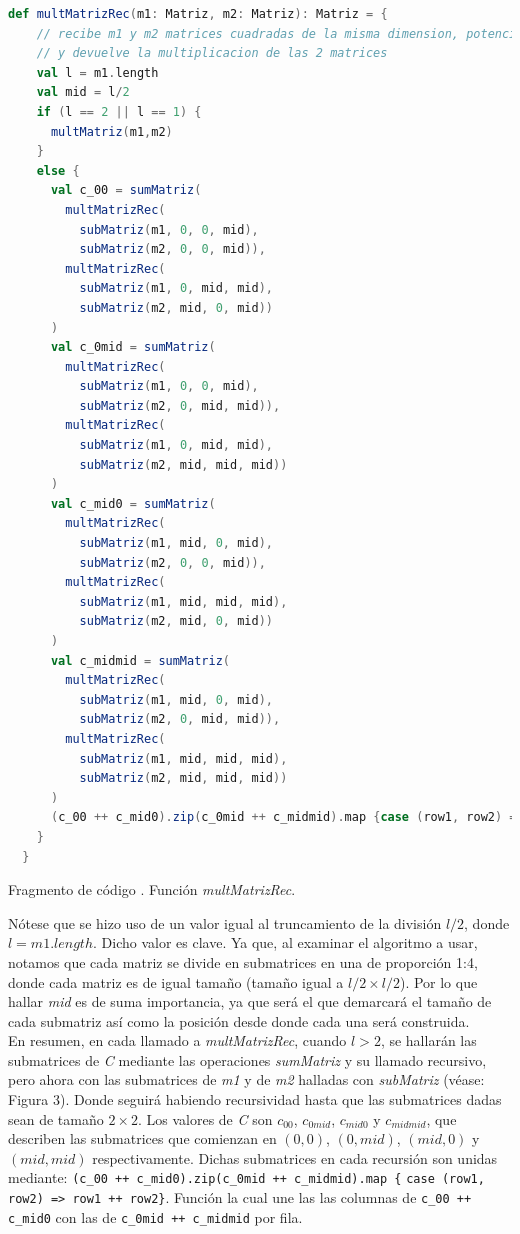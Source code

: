 \documentclass{article}
\newcounter{codesnippet}
\newcommand{\newcodesnippet}{%
  \stepcounter{codesnippet}%
}
\begin{document}
\newcodesnippet
\begin{lstlisting}[language=Scala]
  def multMatrizRec(m1: Matriz, m2: Matriz): Matriz = {
    // recibe m1 y m2 matrices cuadradas de la misma dimension, potencia de 2
    // y devuelve la multiplicacion de las 2 matrices
    val l = m1.length
    val mid = l/2
    if (l == 2 || l == 1) {
      multMatriz(m1,m2)
    }
    else {
      val c_00 = sumMatriz(
        multMatrizRec(
          subMatriz(m1, 0, 0, mid),
          subMatriz(m2, 0, 0, mid)),
        multMatrizRec(
          subMatriz(m1, 0, mid, mid),
          subMatriz(m2, mid, 0, mid))
      )
      val c_0mid = sumMatriz(
        multMatrizRec(
          subMatriz(m1, 0, 0, mid),
          subMatriz(m2, 0, mid, mid)),
        multMatrizRec(
          subMatriz(m1, 0, mid, mid),
          subMatriz(m2, mid, mid, mid))
      )
      val c_mid0 = sumMatriz(
        multMatrizRec(
          subMatriz(m1, mid, 0, mid),
          subMatriz(m2, 0, 0, mid)),
        multMatrizRec(
          subMatriz(m1, mid, mid, mid),
          subMatriz(m2, mid, 0, mid))
      )
      val c_midmid = sumMatriz(
        multMatrizRec(
          subMatriz(m1, mid, 0, mid),
          subMatriz(m2, 0, mid, mid)),
        multMatrizRec(
          subMatriz(m1, mid, mid, mid),
          subMatriz(m2, mid, mid, mid))
      )
      (c_00 ++ c_mid0).zip(c_0mid ++ c_midmid).map {case (row1, row2) => row1 ++ row2}
    }
  }
\end{lstlisting}
\begin{center}
    \small{Fragmento de código \thecodesnippet. Función \textit{multMatrizRec}.}
\end{center}

Nótese que se hizo uso de un valor igual al truncamiento de la división \(l/2\), donde \(l = m1.length\). Dicho valor es clave. Ya que, al examinar el algoritmo a usar, notamos que cada matriz se divide en submatrices en una de proporción 1:4, donde cada matriz es de igual tamaño (tamaño igual a \(l/2 \times l/2 \)). Por lo que hallar \textit{mid} es de suma importancia, ya que será el que demarcará el tamaño de cada submatriz así como la posición desde donde cada una será construida. \\

En resumen, en cada llamado a \textit{multMatrizRec}, cuando \(l > 2\), se hallarán las submatrices de \textit{C} mediante las operaciones \textit{sumMatriz} y su llamado recursivo, pero ahora con las submatrices de \textit{m1} y de \textit{m2} halladas con \textit{subMatriz} (véase: Figura 3). Donde seguirá habiendo recursividad hasta que las submatrices dadas sean de tamaño \(2 \times 2\). Los valores de \textit{C} son \(c_{00}\), \(c_{0mid}\), \(c_{mid0}\) y \(c_{midmid}\), que describen las submatrices que comienzan en \((0,0)\), \((0,mid)\), \((mid,0)\) y \((mid,mid)\) respectivamente. Dichas submatrices en cada recursión son unidas mediante: \verb|(c_00 ++ c_mid0).zip(c_0mid ++ c_midmid).map {| \verb|case (row1, row2) => row1 ++ row2}|. Función la cual une las las columnas de \verb|c_00 ++ c_mid0| con las de \verb|c_0mid ++ c_midmid| por fila.
\end{document}
